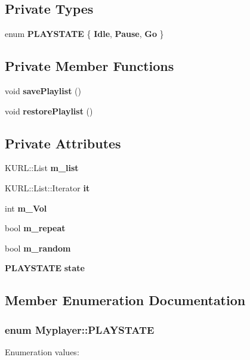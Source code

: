 \subsection*{Private Types}
\begin{CompactItemize}
\item 
enum {\bf PLAYSTATE} \{ {\bf Idle}, 
{\bf Pause}, 
{\bf Go}
 \}
\end{CompactItemize}
\subsection*{Private Member Functions}
\begin{CompactItemize}
\item 
void {\bf save\-Playlist} ()
\item 
void {\bf restore\-Playlist} ()
\end{CompactItemize}
\subsection*{Private Attributes}
\begin{CompactItemize}
\item 
KURL::List {\bf m\_\-list}
\item 
KURL::List::Iterator {\bf it}
\item 
int {\bf m\_\-Vol}
\item 
bool {\bf m\_\-repeat}
\item 
bool {\bf m\_\-random}
\item 
{\bf PLAYSTATE} {\bf state}
\end{CompactItemize}


\subsection{Member Enumeration Documentation}
\subsubsection{\setlength{\rightskip}{0pt plus 5cm}enum {\bf Myplayer::PLAYSTATE}\hspace{0.3cm}{\tt  [private]}}\label{classMyplayer_Myplayery3}


\begin{Desc}
\item[Enumeration values: ]\par
\begin{description}
\item[{\em 
Idle\label{classMyplayer_Myplayery3Myplayery0}
}]\item[{\em 
Pause\label{classMyplayer_Myplayery3Myplayery1}
}]\item[{\em 
Go\label{classMyplayer_Myplayery3Myplayery2}
}]\end{description}
\end{Desc}



